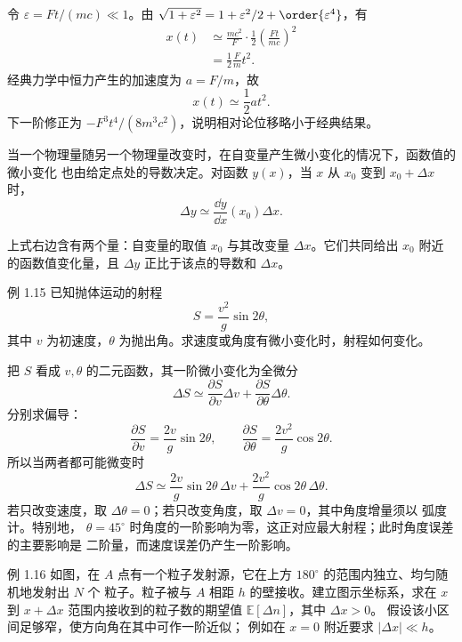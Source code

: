 \begin{xesolution}
令 $\varepsilon=Ft/(mc)\ll1$。由
$\sqrt{1+\varepsilon^2}=1+\varepsilon^2/2+\order{\varepsilon^4}$，有
\begin{align*}
 x(t)
 &\simeq\frac{mc^2}{F}\cdot\frac12
 \left(\frac{Ft}{mc}\right)^2\\
 &=\frac12\frac{F}{m}t^2.
\end{align*}
经典力学中恒力产生的加速度为 $a=F/m$，故
\[
 \boxed{x(t)\simeq\frac12at^2}.
\]
下一阶修正为 $-F^3t^4/(8m^3c^2)$，说明相对论位移略小于经典结果。
\end{xesolution}

当一个物理量随另一个物理量改变时，在自变量产生微小变化的情况下，函数值的微小变化
也由给定点处的导数决定。对函数 $y(x)$，当 $x$ 从 $x_0$ 变到 $x_0+\Delta x$ 时，
\begin{equation}
 \Delta y\simeq\frac{\dd y}{\dd x}(x_0)\Delta x.
\end{equation}

\incrementDiagram

上式右边含有两个量：自变量的取值 $x_0$ 与其改变量 $\Delta x$。它们共同给出 $x_0$
附近的函数值变化量，且 $\Delta y$ 正比于该点的导数和 $\Delta x$。

\begin{origexamplebox}{例 1.15}
已知抛体运动的射程
\[
 S=\frac{v^2}{g}\sin2\theta,
\]
其中 $v$ 为初速度，$\theta$ 为抛出角。求速度或角度有微小变化时，射程如何变化。
\end{origexamplebox}

\begin{xesolution}
把 $S$ 看成 $v,\theta$ 的二元函数，其一阶微小变化为全微分
\[
 \Delta S\simeq
 \frac{\partial S}{\partial v}\Delta v
 +\frac{\partial S}{\partial\theta}\Delta\theta.
\]
分别求偏导：
\[
 \frac{\partial S}{\partial v}=\frac{2v}{g}\sin2\theta,\qquad
 \frac{\partial S}{\partial\theta}=\frac{2v^2}{g}\cos2\theta.
\]
所以当两者都可能微变时
\[
 \boxed{\Delta S\simeq
 \frac{2v}{g}\sin2\theta\,\Delta v
 +\frac{2v^2}{g}\cos2\theta\,\Delta\theta}.
\]
若只改变速度，取 $\Delta\theta=0$；若只改变角度，取 $\Delta v=0$，其中角度增量须以
弧度计。特别地，
$\theta=45^\circ$ 时角度的一阶影响为零，这正对应最大射程；此时角度误差的主要影响是
二阶量，而速度误差仍产生一阶影响。
\end{xesolution}

\Needspace{0.40\textheight}
\begin{origexamplebox}{例 1.16}
如图，在 $A$ 点有一个粒子发射源，它在上方 $180^\circ$ 的范围内独立、均匀随机地发射出 $N$ 个
粒子。粒子被与 $A$ 相距 $h$ 的壁接收。建立图示坐标系，求在 $x$ 到 $x+\Delta x$
范围内接收到的粒子数的期望值 $\mathbb E[\Delta n]$，其中 $\Delta x>0$。
假设该小区间足够窄，使方向角在其中可作一阶近似；
例如在 $x=0$ 附近要求 $|\Delta x|\ll h$。
\probdiagOneSixteen
\end{origexamplebox}

